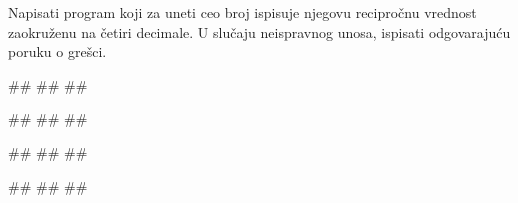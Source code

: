 \begin{Exercise}[label=KT_NG_03] 
Napisati program koji za uneti ceo broj ispisuje njegovu recipročnu vrednost zaokruženu na četiri decimale. 
U slučaju neispravnog unosa, ispisati odgovarajuću poruku o grešci.

\begin{miditest}
\begin{upotreba}{1}
#\naslovInt#
##
##
\end{upotreba}
\end{miditest}
\begin{miditest}
\begin{upotreba}{2}
#\naslovInt#
##
##
\end{upotreba}
\end{miditest}

\begin{miditest}
\begin{upotreba}{3}
#\naslovInt#
##
##
\end{upotreba}
\end{miditest}
\begin{miditest}
\begin{upotreba}{4}
#\naslovInt#
##
##
\end{upotreba}
\end{miditest}

\end{Exercise}
\ifresenja
 \begin{Answer}[ref=KT_NG_03]
\end{Answer}
\fi

